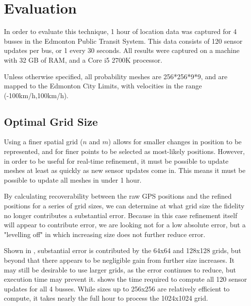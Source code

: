 \section{Evaluation}

In order to evaluate this technique, 1 hour of location data was captured for 4 busses in the Edmonton Public Transit System. This data consists of 120 sensor updates per bus, or 1 every 30 seconds. All results were captured on a machine with 32 GB of RAM, and a Core i5 2700K processor.

Unless otherwise specified, all probability meshes are 256*256*9*9, and are mapped to the Edmonton City Limits, with velocities in the range (-100km/h,100km/h).

\subsection{Optimal Grid Size}
Using a finer spatial grid ($n$ and $m$) allows for smaller changes in position to be represented, and for finer points to be selected as most-likely positions.
However, in order to be useful for real-time refinement, it must be possible to update meshes at least as quickly as new sensor updates come in. This means it must be possible to update all meshes in under 1 hour.

By calculating recoverability between the raw GPS positions and the refined positions for a series of grid sizes, we can determine at what grid size the fidelity no longer contributes a substantial error. Because in this case refinement itself will appear to contribute error, we are looking not for a low absolute error, but a "levelling off" in which increasing size does not further reduce error.



Shown in , substantial error is contributed by the 64x64 and 128x128 grids, but beyond that there appears to be negligible gain from further size increases. It may still be desirable to use larger grids, as the error continues to reduce, but execution time may prevent it.  shows the time required to compute all 120 sensor updates for all 4 busses. While sizes up to 256x256 are relatively efficient to compute, it takes nearly the full hour to process the 1024x1024 grid.





